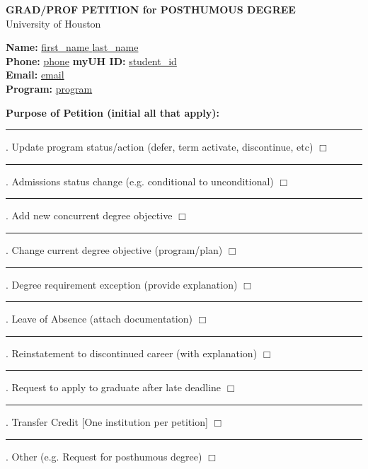 \documentclass[9pt]{article}
\begin{document}
\begin{center}
    {\Large \textbf{GRAD/PROF PETITION for POSTHUMOUS DEGREE}} \\
    \vspace{0.5em}
    University of Houston 
\end{center}

\vspace{1em}

\noindent \textbf{Name:} \underline{{{first_name}} {{last_name}}} \\
\textbf{Phone:} \underline{{{phone}}} \hfill \textbf{myUH ID:} \underline{{{student_id}}} \\
\textbf{Email:} \underline{{{email}}} \\
\textbf{Program:} \underline{{{program}}}

\vspace{1em}

\noindent \textbf{Purpose of Petition (initial all that apply):}

\vspace{0.5em}
\noindent \rule{1in}{0.4pt} . Update program status/action (defer, term activate, discontinue, etc) \quad $\Box$ \\[0.5em]
\noindent \rule{1in}{0.4pt} . Admissions status change (e.g. conditional to unconditional) \quad $\Box$ \\[0.5em]
\noindent \rule{1in}{0.4pt} . Add new concurrent degree objective \quad $\Box$ \\[0.5em]
\noindent \rule{1in}{0.4pt} . Change current degree objective (program/plan) \quad $\Box$ \\[0.5em]
\noindent \rule{1in}{0.4pt} . Degree requirement exception (provide explanation) \quad $\Box$ \\[0.5em]
\noindent \rule{1in}{0.4pt} . Leave of Absence (attach documentation) \quad $\Box$ \\[0.5em]
\noindent \rule{1in}{0.4pt} . Reinstatement to discontinued career (with explanation) \quad $\Box$ \\[0.5em]
\noindent \rule{1in}{0.4pt} . Request to apply to graduate after late deadline \quad $\Box$ \\[0.5em]
\noindent \rule{1in}{0.4pt} . Transfer Credit [One institution per petition] \quad $\Box$ \\[0.5em]
\noindent \rule{1in}{0.4pt} . Other (e.g. Request for posthumous degree) \quad $\Box$

\vspace{1em}
\end{document}
